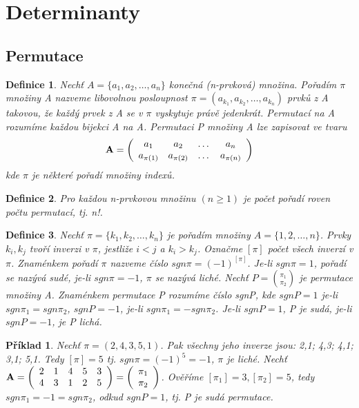 \documentclass[12pt,a4paper]{article}
\newtheorem{definition}{Definice}
\newtheorem{example}{Příklad}
\begin{document}
\section{Determinanty}

\subsection{Permutace}
\begin{definition}
Nechť $A = \{a_1,a_2, \dots, a_n\}$ konečná (n-prvková) množina. Pořadím $\pi$ množiny A nazveme libovolnou posloupnost $\pi = (a_{k_1},a_{k_2}, \dots, a_{k_n})$ prvků z A takovou, že každý prvek z A se v $\pi$ vyskytuje právě jedenkrát. Permutací na A rozumíme každou bijekci A na A. Permutaci P množiny A lze zapisovat ve tvaru
\begin{displaymath}
{\bf A} =
\left( \begin{array}{cccc}
a_{1} & a_{2} & \dots & a_{n} \\
a_{\pi (1)} & a_{\pi (2)} & \dots & a_{\pi (n)} \\

\end{array} \right)
\end{displaymath}
kde $\pi$ je některé pořadí množiny indexů.
\end{definition}

\begin{definition}
	Pro každou n-prvkovou množinu $(n \geq 1)$ je počet pořadí roven počtu permutací, tj. n!.
\end{definition}


\begin{definition}
	Nechť $\pi = \{k_1,k_2, \dots, k_n\}$ je pořadím množiny $A = \{ 1,2,\dots, n\}$. Prvky $k_i,k_j$ tvoří inverzi v $\pi$, jestliže $i < j$ a  $k_i > k_j$. Označme $[\pi]$ počet všech inverzí v $\pi$. Znaménkem pořadí $\pi$ nazveme číslo $sgn\pi = (-1)^{[\pi]}$. Je-li $sgn\pi = 1$, pořadí se nazývá sudé, je-li $sgn\pi = -1$,  $\pi$ se nazývá liché. Nechť $P = { \pi_1 \choose \pi_2}$ je permutace množiny A. Znaménkem permutace P rozumíme číslo sgnP, kde $sgnP = 1$ je-li $sgn\pi_1 = sgn\pi_2$, $sgnP = -1$, je-li $sgn\pi_1 = - sgn\pi_2$. Je-li $sgnP = 1$, P je sudá, je-li $sgnP = -1$, je P lichá.
\end{definition}

\begin{example}
	Nechť $\pi = (2,4,3,5,1)$. Pak všechny jeho inverze jsou: 2,1; 4,3; 4,1; 3,1; 5,1. Tedy $[\pi] = 5$ tj. $sgn\pi = (-1)^5 = -1$, $\pi$ je liché.
	Nechť ${\bf A} =
\left( \begin{array}{ccccc}
2 & 1 & 4 & 5 & 3 \\
4 & 3 & 1 & 2 & 5 \\
\end{array} \right) = \left( \begin{array}{c}
\pi_1 \\
\pi_2 \\
\end{array} \right) $. Ověříme $[\pi_1] = 3, [\pi_2] = 5$, tedy $sgn\pi_1 = -1 = sgn\pi_2$, odkud $sgnP = 1$, tj. P je sudá permutace.
\end{example}
\end{document}
